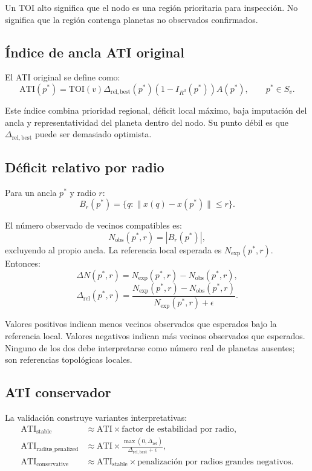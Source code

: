 \documentclass[11pt]{article}
\begin{document}
Un TOI alto significa que el nodo es una región prioritaria para inspección. No significa que la región contenga planetas no observados confirmados.

\subsection{Índice de ancla ATI original}

El ATI original se define como:
\[
\mathrm{ATI}(p^*)=\mathrm{TOI}(v)\Delta_{\mathrm{rel,best}}(p^*)(1-I_{R^3}(p^*))A(p^*),\qquad p^*\in S_v.
\]

Este índice combina prioridad regional, déficit local máximo, baja imputación del ancla y representatividad del planeta dentro del nodo. Su punto débil es que $\Delta_{\mathrm{rel,best}}$ puede ser demasiado optimista.

\subsection{Déficit relativo por radio}

Para un ancla $p^*$ y radio $r$:
\[
B_r(p^*)=\{q:\|x(q)-x(p^*)\|\leq r\}.
\]

El número observado de vecinos compatibles es:
\[
N_{\mathrm{obs}}(p^*,r)=|B_r(p^*)|,
\]
excluyendo al propio ancla. La referencia local esperada es $N_{\mathrm{exp}}(p^*,r)$. Entonces:
\[
\Delta N(p^*,r)=N_{\mathrm{exp}}(p^*,r)-N_{\mathrm{obs}}(p^*,r),
\]
\[
\Delta_{\mathrm{rel}}(p^*,r)=\frac{N_{\mathrm{exp}}(p^*,r)-N_{\mathrm{obs}}(p^*,r)}{N_{\mathrm{exp}}(p^*,r)+\epsilon}.
\]

Valores positivos indican menos vecinos observados que esperados bajo la referencia local. Valores negativos indican más vecinos observados que esperados. Ninguno de los dos debe interpretarse como número real de planetas ausentes; son referencias topológicas locales.

\subsection{ATI conservador}

La validación construye variantes interpretativas:
\begin{align*}
\mathrm{ATI}_{\mathrm{stable}} &\approx \mathrm{ATI}\times \text{factor de estabilidad por radio},\\
\mathrm{ATI}_{\mathrm{radius\_penalized}} &\approx \mathrm{ATI}\times \frac{\max(0,\overline{\Delta}_{\mathrm{rel}})}{\Delta_{\mathrm{rel,best}}+\epsilon},\\
\mathrm{ATI}_{\mathrm{conservative}} &\approx \mathrm{ATI}_{\mathrm{stable}}\times \text{penalización por radios grandes negativos}.
\end{align*}
\end{document}
